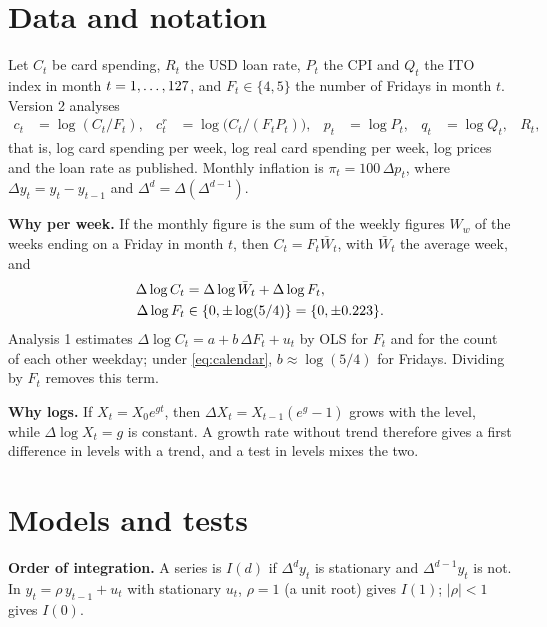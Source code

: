\documentclass[11pt,a4paper]{article}
\begin{document}
\section{Data and notation}

Let $C_t$ be card spending, $R_t$ the USD loan rate, $P_t$ the CPI and $Q_t$ the ITO index in month $t = 1, \dots, 127$, and
$F_t \in \{4, 5\}$ the number of Fridays in month $t$. Version 2 analyses
\begin{align}
c_t &= \log (C_t / F_t), & c^{r}_t &= \log \bigl(C_t / (F_t P_t)\bigr), & p_t &= \log P_t, & q_t &= \log Q_t, & R_t, \label{eq:series}
\end{align}
that is, log card spending per week, log real card spending per week, log prices and the loan rate as published. Monthly inflation
is $\pi_t = 100\,\Delta p_t$, where $\Delta y_t = y_t - y_{t-1}$ and $\Delta^d = \Delta(\Delta^{d-1})$.

\textbf{Why per week.} If the monthly figure is the sum of the weekly figures $W_w$ of the weeks ending on a Friday in month $t$,
then $C_t = F_t \bar W_t$, with $\bar W_t$ the average week, and
\begin{equation}
\begin{split}
\Delta \log C_t &= \Delta \log \bar W_t + \Delta \log F_t,\\
\Delta \log F_t &\in \{0, \pm\log(5/4)\} = \{0, \pm 0.223\}.
\end{split}
\label{eq:calendar}
\end{equation}
Analysis 1 estimates $\Delta \log C_t = a + b\,\Delta F_t + u_t$ by OLS for $F_t$ and for the count of each other weekday; under
\eqref{eq:calendar}, $b \approx \log(5/4)$ for Fridays. Dividing by $F_t$ removes this term.

\textbf{Why logs.} If $X_t = X_0 e^{g t}$, then $\Delta X_t = X_{t-1}(e^{g} - 1)$ grows with the level, while $\Delta \log X_t = g$ is
constant. A growth rate without trend therefore gives a first difference in levels with a trend, and a test in levels mixes the two.

\section{Models and tests}

\textbf{Order of integration.} A series is $I(d)$ if $\Delta^{d} y_t$ is stationary and $\Delta^{d-1} y_t$ is not. In
$y_t = \rho\, y_{t-1} + u_t$ with stationary $u_t$, $\rho = 1$ (a unit root) gives $I(1)$; $|\rho| < 1$ gives $I(0)$.
\end{document}
